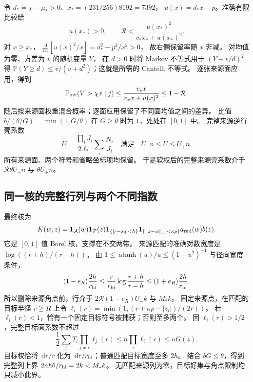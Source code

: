 \documentclass[UTF8,a4paper,11pt,fontset=fandol]{ctexart}
\theoremstyle{remark}
\newcommand{\one}{\mathbf 1}
\newcommand{\norm}[1]{\left\lVert#1\right\rVert}
\newcommand{\dint}{\,\mathrm d}
\begin{document}
令 $d_* =\chi-\mu_*>0$、$x_*=(231/256)8192=7392$，
$u(x)=d_*x-p$。准确有限比较给
\begin{equation}\label{eq:cantelli-base-ret}
 u(x_*)>0,\qquad \mathcal R<\frac{u(x_*)^2}{v_*x_*+u(x_*)^2}.
\end{equation}
对 $x\ge x_*$，
$\frac{\dint}{\dint x}[u(x)^2/x]=d_*^2-p^2/x^2>0$，
故右侧保留率随 $x$ 非减。
对均值为零、方差为 $v$ 的随机变量 $Y$，
在 $d>0$ 时将 Markov 不等式用于 $(Y+v/d)^2$ 得
$\mathbb P(Y\ge d)\le v/(v+d^2)$；这就是所需的 Cantelli 不等式。
逐张来源面应用，得到
\[
 \mathbb P_{\rm inv}(V>\chi x\mid j)
 \le\frac{v_*x}{v_*x+u(x)^2}\le1-\mathcal R.
\]
随后按来源面权重混合概率；逐面应用保留了不同面均值之间的差异。
比值 $b/(\theta/G)=\min(1,G/\theta)$ 在 $G\ge\theta$ 时为 $1$，处处在 $[0,1]$ 中。
完整来源逆行壳系数
\[
 U=\frac{\prod_iJ_i}{2\ell_*}\sum_i\frac{N_i}{J_i}
 \quad\text{满足}\quad U_-n\le U\le U_+n.
\]
所有来源面、两个符号和省略坐标项均保留。
于是软权后的完整来源壳系数介于 $\mathcal R\theta U_-n$ 与 $\theta U_+n$。

\subsection{同一核的完整行列与两个不同指数}\label{subsec:cantelli-degrees}
最终核为
\[
 K(w,z)=\one_{\mathcal A}(w)\one_{\mathcal P}(z)
 \one_{\{|r-sq|<h\}}\one_{\{\norm{z-w}_\infty<\kappa\rho\}}
 a_{\rm rad}(w)b(z).
\]
它是 $[0,1]$ 值 Borel 核，支撑在不交两带。
来源匹配的准确对数宽度是 $\log((r+h)/(r-h))$。
由 $1\le\operatorname{atanh}(u)/u\le(1-u^2)^{-1}$ 与径向宽度条件，
\[
 (1-e_R)\frac{2h}{r_{\rm hi}}
 \le\frac r{r_{\rm hi}}\log\frac{r+h}{r-h}
 \le(1+e_R)\frac{2h}{r_{\rm hi}}.
\]
所以删除来源角点前，行介于 $2\mathcal R(1-e_R)U_-k$ 与 $M_*k$。
固定来源点，在匹配的目标半径 $r\ge R$ 上令
$\ell_i(r)=\min(1,(r+\kappa\rho-|z_i|)/(2r))$。
若 $\ell_i(r)<1$，恰有一个固定目标符号被捕获；否则至多两个。
因 $\ell_i(r)>1/2$，完整目标面系数不超过
\[
 \frac12\sum_i T_i\prod_{j\ne i}\ell_j(r)
 \le n\prod_i\ell_i(r)\le nG(z).
\]
目标权恰将 $\dint r/r$ 化为 $\dint r/r_{\rm hi}$；普通匹配目标宽度至多 $2h$。
结合 $bG\le\theta$，得到完整列上界 $2nh\theta/r_{\rm hi}=2k<M_*k$。
无匹配来源列为零，目标好集与角点限制均只减小此界。
\end{document}
